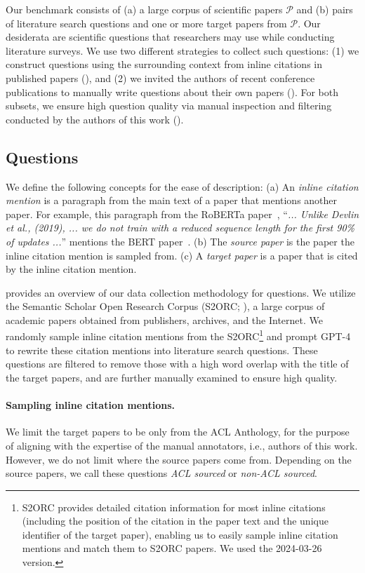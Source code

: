 Our benchmark \ours{} consists of 
(a) a large corpus of scientific papers $\mathcal{P}$ and 
(b) pairs of literature search questions and one or more target papers from $\mathcal{P}$. 
Our desiderata are scientific questions that researchers may use while conducting literature surveys. 
We use two different strategies to collect such questions: (1) we construct questions using the surrounding context from inline citations in published papers (), and (2) we invited the authors of recent conference publications to manually write questions about their own papers (). For both subsets, we ensure high question quality via manual inspection and filtering conducted by the authors of this work ().

\subsection{\inlineQ{} Questions}
\label{sec:inline}
We define the following concepts for the ease of description: 
(a) An \textit{inline citation mention} is a paragraph from the main text of a paper that mentions another paper. For example, this paragraph from the RoBERTa paper~\citep{liu2019roberta}, ``\textit{... Unlike Devlin et al., (2019), ... we do not train with a reduced sequence length for the first 90\% of updates ...}'' mentions the BERT paper~\citep{devlin2019bert}.
(b) The \textit{source paper} is the paper the inline citation mention is sampled from. 
(c) A \textit{target paper} is a paper that is cited by the inline citation mention.

 provides an overview of our data collection methodology for \inlineq{} questions. We utilize the Semantic Scholar Open Research Corpus (S2ORC; \citealp{lo-etal-2020-s2orc}), a large corpus of academic papers obtained from publishers, archives, and the  Internet. We randomly sample inline citation mentions 
from the S2ORC\footnote{S2ORC provides detailed citation information for most inline citations (including the position of the citation in the paper text and the unique identifier of the target paper), enabling us to easily sample inline citation mentions and match them to S2ORC papers. We used the 2024-03-26 version.} and prompt 
GPT-4 to rewrite these citation mentions into literature search questions. 
These questions are filtered to remove those with a high word overlap with the title of the target papers, and are further manually examined to ensure high quality.

\paragraph{Sampling inline citation mentions.}
We limit the target papers to be only from the ACL Anthology, for the purpose of aligning with the expertise of the manual annotators, i.e., authors of this work. However, we do not limit where the source papers come from. Depending on the source papers, we call 
these questions \emph{ACL sourced} or \emph{non-ACL sourced}.

